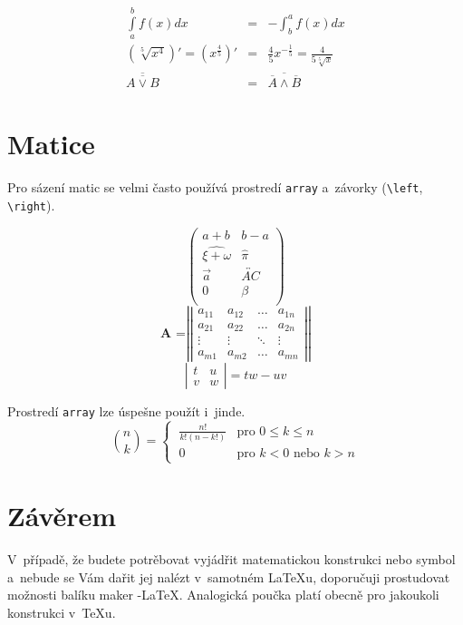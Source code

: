 \documentclass[11pt, titlepage, a4paper, twocolumn]{article}
\theoremstyle{definition}
\theoremstyle{plain}
\begin{document}
        \begin{eqnarray}
        \int\limits_{a}^{b}f(x)dx&=&-\int_{b}^{a}f(x)dx\\
        \left(\sqrt[5]{x^4}\right)'=\left(x^{\frac{4}{5}}\right)'&=&\frac{4}{5}x^{-\frac{1}{5}}=\frac{4}{5\sqrt[5]
        {x}}\\
        \overline{\overline {A \vee B}}&=&\overline{\overline A \wedge \overline B}
        \end{eqnarray}
    \par

    \section{Matice}
        Pro sázení matic se velmi často používá prostredí \texttt{array} a~závorky (\verb|\left|, \verb|\right|).

        $$\left(\begin{array}{cc} a+b&b-a\\
        \widehat{\xi+\omega}&\hat{\pi}\\
        \vec{a}&\overleftrightarrow{AC}\\
        0&\beta\\
        \end{array}\right)$$
        $$\textbf{A =}\left|\left| \begin{array}{cccc}
        a_{11} & a_{12} & \dots& a_{1n} \\
        a_{21}& a_{22} & \dots & a_{2n} \\
        \vdots & \vdots & \ddots & \vdots \\
        a_{m1} & a_{m2} & \dots & a_{mn}
        \end{array}\right|\right|$$
        $$\left|\begin{array}{cc}
        t &u\\
        v&w
        \end{array}\right|=tw-uv$$

        Prostredí \texttt{array} lze úspešne použít i~jinde.
        $$\binom{n}{k} = \begin{cases}
        \ \frac{n!}{k!(n-k!)} & \text{pro } 0\leq k \leq n\\
        \ 0& \text{pro } k < 0 \text{ nebo } k > n \end{cases}$$
    \par

    \section{Závěrem}
        V~případě, že budete potrěbovat vyjádřit matematickou konstrukci nebo symbol a~nebude se Vám dařit
        jej nalézt v~samotném \LaTeX u, doporučuji prostudovat možnosti balíku maker \AmS-\LaTeX.
        Analogická poučka platí obecně pro jakoukoli konstrukci v~\TeX u.
    \par
\end{document}
